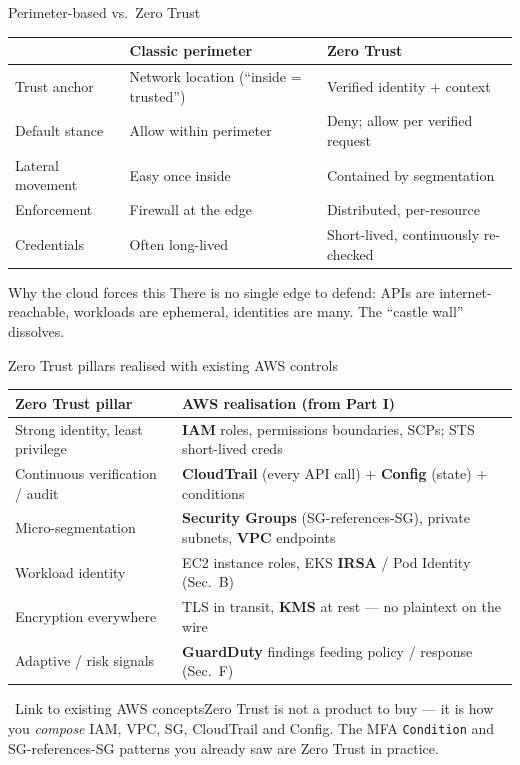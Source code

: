 \documentclass[aspectratio=169,10pt]{beamer}
\newcommand{\svc}[1]{{\color{accent}\textsf{\textbf{#1}}}}      %
\newcommand{\term}[1]{{\color{awsink}\textbf{#1}}}
\newcommand{\bridge}[1]{%
  \begin{block}{\small\ding{43}\ Link to existing AWS concepts}\small #1\end{block}}
\begin{document}
\begin{frame}{Perimeter-based vs.\ Zero Trust}
  \centering\small
  \renewcommand{\arraystretch}{1.3}
  \begin{tabular}{>{\raggedright\arraybackslash}p{3.0cm} >{\raggedright\arraybackslash}p{4.7cm} >{\raggedright\arraybackslash}p{4.7cm}}
    \toprule
     & \textbf{Classic perimeter} & \textbf{Zero Trust}\\
    \midrule
    Trust anchor   & Network location (``inside = trusted'') & Verified identity + context\\
    Default stance & Allow within perimeter                  & Deny; allow per verified request\\
    Lateral movement& Easy once inside                       & Contained by segmentation\\
    Enforcement    & Firewall at the edge                    & Distributed, per-resource\\
    Credentials    & Often long-lived                        & Short-lived, continuously re-checked\\
    \bottomrule
  \end{tabular}
  \vfill
  \begin{alertblock}{\footnotesize Why the cloud forces this}
    \footnotesize There is no single edge to defend: APIs are internet-reachable, workloads are
    ephemeral, identities are many. The ``castle wall'' dissolves.
  \end{alertblock}
\end{frame}

\begin{frame}{Zero Trust pillars realised with existing AWS controls}
  \centering\small
  \renewcommand{\arraystretch}{1.3}
  \begin{tabular}{>{\raggedright\arraybackslash}p{4.2cm} >{\raggedright\arraybackslash}p{7.4cm}}
    \toprule
    \textbf{Zero Trust pillar} & \textbf{AWS realisation (from Part I)}\\
    \midrule
    Strong identity, least privilege & \svc{IAM} roles, permissions boundaries, SCPs; STS short-lived creds\\
    Continuous verification / audit  & \svc{CloudTrail} (every API call) + \svc{Config} (state) + conditions\\
    Micro-segmentation               & \svc{Security Groups} (SG-references-SG), private subnets, \svc{VPC} endpoints\\
    Workload identity                & EC2 instance roles, EKS \term{IRSA} / Pod Identity (Sec.~B)\\
    Encryption everywhere            & TLS in transit, \svc{KMS} at rest --- no plaintext on the wire\\
    Adaptive / risk signals          & \svc{GuardDuty} findings feeding policy / response (Sec.~F)\\
    \bottomrule
  \end{tabular}
  \vfill
  \bridge{Zero Trust is not a product to buy --- it is how you \emph{compose} IAM, VPC, SG,
  CloudTrail and Config. The MFA \texttt{Condition} and SG-references-SG patterns you already saw
  are Zero Trust in practice.}
\end{frame}
\end{document}
